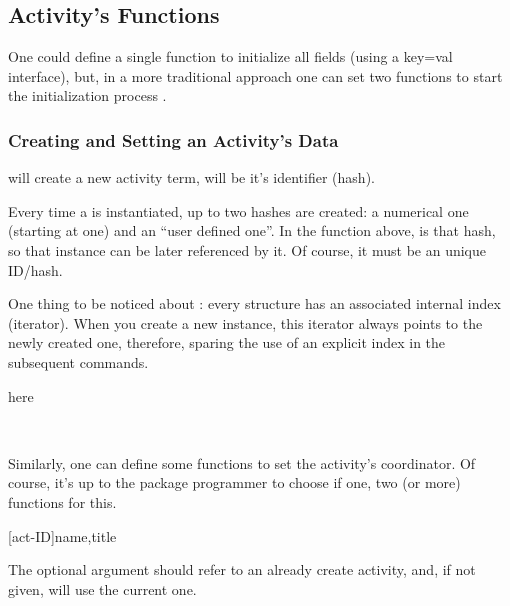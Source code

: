 \documentclass[10pt]{article}
\begin{document}

\subsection{Activity's Functions}

One could define a single function to initialize all fields (using a key=val interface), but, in a more traditional approach  one can set two functions to start the initialization process \tsobj{\NewActivity,\ActivitySet}. 


\subsubsection{Creating and Setting an Activity's Data}

\begin{codedescribe}{\NewActivity}
\begin{codesyntax}
\end{codesyntax}
\tsobj{\NewActivity} will create a new activity term,  will be it's identifier (hash).

\end{codedescribe}
\begin{tsremark}
  Every time a  is instantiated, up to two hashes are created: a numerical one (starting at one) and an ``user defined one''. In the \tsobj{\NewActivity} function above,  is that hash, so that instance can be later referenced by it. Of course, it must be an unique ID/hash.
\end{tsremark}
\begin{tsremark}
  One thing to be noticed about : every structure has an associated internal index (iterator). When you create a new instance, this iterator always points to the newly created one, therefore, sparing the use of an explicit index in the subsequent commands.
\end{tsremark}


here

~

Similarly, one can define some functions to set the activity's coordinator. Of course, it's up to the package programmer to choose if one, two (or more) functions for this.

\begin{codedescribe}{\ActivitySetCoord}
\begin{codesyntax}
  \tsmacro{\ActivitySetCoord}[act-ID]{name,title}
\end{codesyntax}
The optional argument  should refer to an already create activity, and, if not given, will use the current one.
\end{codedescribe}
\end{document}
